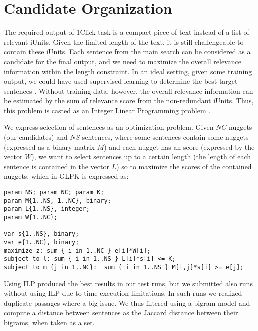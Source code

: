 \section{Candidate Organization}

The required output of 1Click task is a compact piece of text instead
of a list of relevant iUnits.  Given the limited length of the text,
it is still challengeable to contain these iUnits.  Each sentence from
the main search can be considered as a candidate for the final output,
and we need to maximize the overall relevance information within the
length constraint.  In an ideal setting, given some training output,
we could have used supervised learning to determine the best target
sentences \cite{Gondek_al:12}. Without training data, however, the
overall relevance information can be estimated by the sum of relevance
score from the non-redundant iUnits.  Thus, this problem is casted as
an Integer Linear Programming problem \cite{McDonald_ECIR07}.

We express selection of sentences as an optimization problem. Given
$NC$ nuggets (our candidates) and $NS$ sentences, where some sentences
contain some nuggets (expressed as a binary matrix $M$) and each
nugget has an score (expressed by the vector $W$), we want to select
sentences up to a certain length (the length of each sentence is
contained in the vector $L$) so to maximize the scores of the
contained nuggets, which in GLPK \cite{Makhorin/00/GLPK} is expressed as:

\begin{verbatim}
param NS; param NC; param K;  
param M{1..NS, 1..NC}, binary; 
param L{1..NS}, integer; 
param W{1..NC}; 

var s{1..NS}, binary; 
var e{1..NC}, binary; 
maximize z: sum { i in 1..NC } e[i]*W[i]; 
subject to l: sum { i in 1..NS } L[i]*s[i] <= K; 
subject to m {j in 1..NC}:  sum { i in 1..NS } M[i,j]*s[i] >= e[j];
\end{verbatim}

Using ILP produced the best results in our test runs, but we submitted
also runs without using ILP due to time execution limitations. In such
runs we realized duplicate passages where a big issue. We thus
filtered using a bigram model and compute a distance between sentences
as the Jaccard distance \cite{Jaccard} between their bigrams, when
taken as a set.

